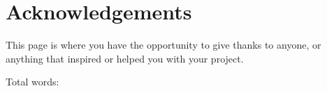 \chapter*{Acknowledgements}
This page is where you have the opportunity to give thanks to anyone, or anything that inspired or helped you with your project.



\vspace{3cm}

\begin{tikzpicture}[
    node distance = 0mm and 1mm,
box/.style = {text width=15cm, font=\normalsize},  %
                    ]
\end{tikzpicture}


\vspace{1cm}
Total words:  

